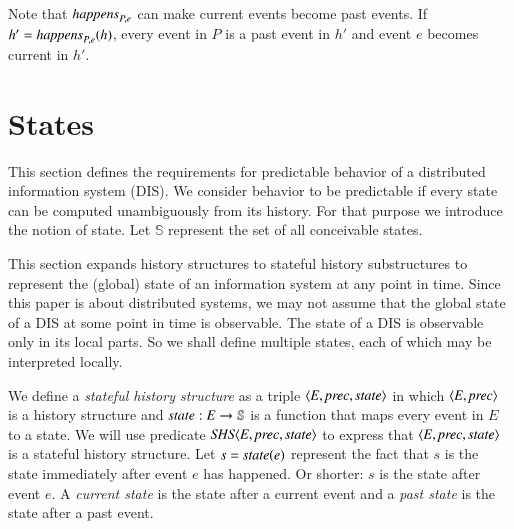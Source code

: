 \documentclass{elsarticle}
\def\id#1{\text{\em #1\/}}
\def\Events{{\mathit E}}
\begin{document}
	Note that $\id{happens}_{P,e}$ can make current events become past events.
	If $h'=\id{happens}_{P,e}(h)$, every event in $P$ is a past event in $h'$ and event $e$ becomes current in $h'$.

\section{States}
	This section defines the requirements for predictable behavior of a distributed information system (DIS).
	We consider behavior to be predictable if every state can be computed unambiguously from its history.
	For that purpose we introduce the notion of state.
	Let $\mathbb S$ represent the set of all conceivable states.

	This section expands history structures to stateful history substructures
	to represent the (global) state of an information system at any point in time.
	Since this paper is about distributed systems,
	we may not assume that the global state of a DIS at some point in time is observable.
	The state of a DIS is observable only in its local parts.
	So we shall define multiple states, each of which may be interpreted locally.

	We define a {\em stateful history structure} as a triple $\la\Events, \id{prec}, \id{state}\ra$ in which
	$\la \Events, \id{prec}\ra$ is a history structure and $\id{state}:\Events\rightarrow{\mathbb S}$ is a function
	that maps every event in $\Events$ to a state.
	We will use predicate $\id{SHS}\la \Events, \id{prec}, \id{state}\ra$
	to express that $\la \Events, \id{prec}, \id{state}\ra$ is a stateful history structure.
	Let $s=\id{state}(e)$ represent the fact that $s$ is the state immediately after event $e$ has happened.
	Or shorter: $s$ is the state after event $e$.
	A {\em current state} is the state after a current event
	and a {\em past state} is the state after a past event.
\end{document}
